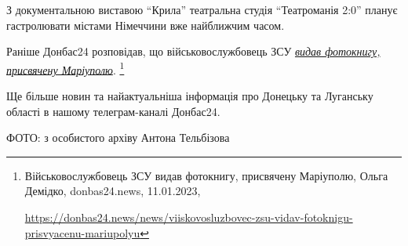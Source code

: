 З документальною виставою \enquote{Крила} театральна студія \enquote{Театроманія 2:0} планує
гастролювати містами Німеччини вже найближчим часом.


Раніше Донбас24 розповідав, що військовослужбовець ЗСУ \href{https://donbas24.news/news/viiskovosluzbovec-zsu-vidav-fotoknigu-prisvyacenu-mariupolyu}{\emph{видав фотокнигу, присвячену Маріуполю}}.%
\footnote{Військовослужбовець ЗСУ видав фотокнигу, присвячену Маріуполю, Ольга Демідко, donbas24.news, 11.01.2023, \par\url{https://donbas24.news/news/viiskovosluzbovec-zsu-vidav-fotoknigu-prisvyacenu-mariupolyu}}

Ще більше новин та найактуальніша інформація про Донецьку та Луганську області
в нашому телеграм-каналі Донбас24.

ФОТО: з особистого архіву Антона Тельбізова

